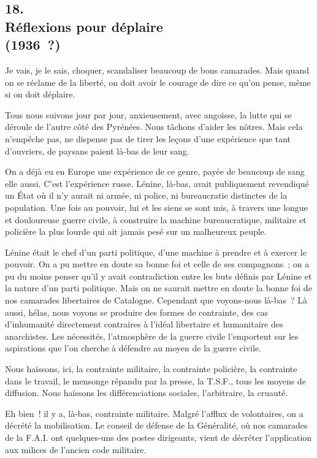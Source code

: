 \documentclass[french,twoside]{book} %
\begin{document}
\subsection[18. Réflexions pour déplaire, (1936 ?)]{18. \\
Réflexions pour déplaire \\
(1936 ?)}
\noindent \par
Je vais, je le sais, choquer, scandaliser beaucoup de bons camarades. Mais quand on se réclame de la liberté, on doit avoir le courage de dire ce qu'on pense, même si on doit déplaire.\par
Tous nous suivons jour par jour, anxieusement, avec angoisse, la lutte qui se déroule de l'autre côté des Pyrénées. Nous tâchons d'aider les nôtres. Mais cela n'empêche pas, ne dispense pas de tirer les leçons d'une expérience que tant d'ouvriers, de paysans paient là-bas de leur sang.\par
On a déjà eu en Europe une expérience de ce genre, payée de beaucoup de sang elle aussi. C'est l'expérience russe. Lénine, là-bas, avait publiquement revendiqué un État où il n'y aurait ni armée, ni police, ni bureaucratie distinc­tes de la population. Une fois au pouvoir, lui et les siens se sont mis, à travers une longue et douloureuse guerre civile, à construire la machine bureau­cratique, militaire et policière la plus lourde qui ait jamais pesé sur un malheureux peuple.\par
Lénine était le chef d'un parti politique, d'une machine à prendre et à exercer le pouvoir. On a pu mettre en doute sa bonne foi et celle de ses compagnons ; on a pu du moins penser qu'il y avait contradiction entre les buts définis par Lénine et la nature d'un parti politique. Mais on ne saurait mettre en doute la bonne foi de nos camarades libertaires de Catalogne. Cependant que voyons-nous là-bas ? Là aussi, hélas, nous voyons se produire des formes de contrainte, des cas d'inhumanité directement contraires à l'idéal libertaire et humanitaire des anarchistes. Les nécessités, l'atmosphère de la guerre civile l'emportent sur les aspirations que l'on cherche à défendre au moyen de la guerre civile.\par
Nous haïssons, ici, la contrainte militaire, la contrainte policière, la con­trainte dans le travail, le mensonge répandu par la presse, la T.S.F., tous les moyens de diffusion. Nous haïssons les différenciations sociales, l'arbitraire, la cruauté.\par
Eh bien ! il y a, là-bas, contrainte militaire. Malgré l'afflux de volontaires, on a décrété la mobilisation. Le conseil de défense de la Généralité, où nos camarades de la F.A.I. ont quelques-uns des postes dirigeants, vient de décré­ter l'application aux milices de l'ancien code militaire.\par
\end{document}
